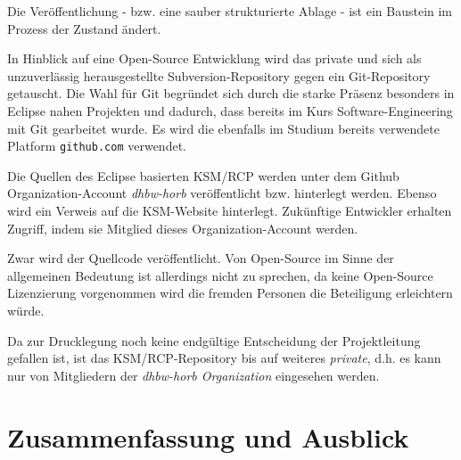 \documentclass[%
12pt,titlepage,abstracton]{scrreprt}
\begin{document}
Die Veröffentlichung - bzw. eine sauber strukturierte Ablage - ist ein Baustein
im Prozess der Zustand ändert.

In Hinblick auf eine Open-Source Entwicklung wird das private und sich als
unzuverlässig herausgestellte Subversion-Repository gegen ein Git-Repository
getauscht. Die Wahl für Git begründet sich durch die starke Präsenz besonders in
Eclipse nahen Projekten und dadurch, dass bereits im Kurs Software-Engineering
mit Git gearbeitet wurde. Es wird die ebenfalls im Studium bereits verwendete
Platform \texttt{github.com} verwendet.

Die Quellen des Eclipse basierten KSM/RCP werden unter dem Github
Organization-Account \textit{dhbw-horb} veröffentlicht bzw. hinterlegt werden.
Ebenso wird ein Verweis auf die KSM-Website hinterlegt. Zukünftige Entwickler
erhalten Zugriff, indem sie Mitglied dieses Organization-Account werden.

Zwar wird der Quellcode veröffentlicht. Von Open-Source im Sinne der allgemeinen
Bedeutung ist allerdings nicht zu sprechen, da keine Open-Source Lizenzierung
vorgenommen wird die fremden Personen die Beteiligung erleichtern würde.

Da zur Drucklegung noch keine endgültige Entscheidung der Projektleitung
gefallen ist, ist das KSM/RCP-Repository bis auf weiteres \textit{private}, d.h.
es kann nur von Mitgliedern der \textit{dhbw-horb Organization} eingesehen werden.



\chapter{Zusammenfassung und Ausblick}\label{chapter:ausblick}





\end{document}
